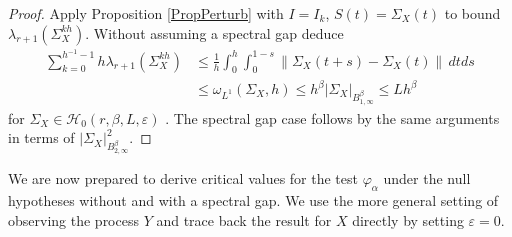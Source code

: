 \documentclass[preprint,aos]{imsart}
\numberwithin{equation}{section}
\theoremstyle{remark}
\providecommand{\eps}{\varepsilon}
\renewcommand{\phi}{\varphi}
\providecommand{\abs}[1]{\lvert #1 \rvert}
\providecommand{\norm}[1]{\lVert #1 \rVert}
\renewcommand{\le}{\leqslant}
\begin{document}
\begin{proof}
Apply Proposition \ref{PropPerturb}  with $I=I_k$, $S(t)= \Sigma_X(t)$ to bound $\lambda_{r+1}(\Sigma_X^{kh})$. Without assuming a spectral gap deduce
\begin{align*}
\sum_{k=0}^{h^{-1}-1}h\lambda_{r+1}(\Sigma_X^{kh})&\le  \frac1h\int_0^h\int_0^{1-s} \norm{\Sigma_X(t+s)-\Sigma_X(t)}\,dtds\\
&\le \omega_{L^1}(\Sigma_X,h)\le h^\beta\abs{\Sigma_X}_{B^\beta_{1,\infty}}\le Lh^\beta
\end{align*}
for $\Sigma_X\in {\mathcal H}_0(r,\beta,L,\eps)$ . The spectral gap case follows by the same arguments in terms of $\abs{\Sigma_X}_{B^\beta_{2,\infty}}^2$.
\end{proof}


We are now prepared to derive critical values for the test $\phi_\alpha$ under the null hypotheses without and with a spectral gap. We use the more general setting of observing the process $Y$ and trace back the result for $X$ directly by setting $\eps=0$.
\end{document}
